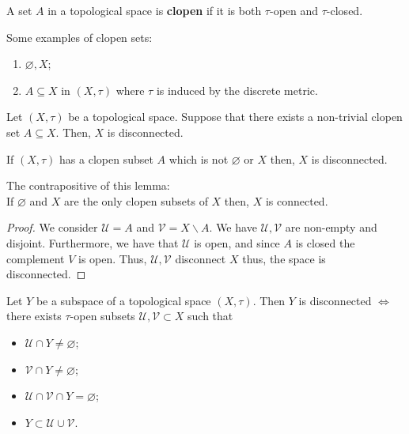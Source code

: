 \documentclass[12pt, a4paper]{article}
\begin{document}
\begin{definition}
    A set \(A\) in a topological space is \textbf{clopen} if it is both \(\tau\)-open and \(\tau\)-closed.
\end{definition}

\begin{example}
    Some examples of clopen sets:
    \begin{enumerate}
        \item \(\varnothing,X\);
        \item \(A \subseteq X\) in \((X,\tau)\) where \(\tau\) is induced by the discrete metric.
    \end{enumerate}
\end{example}


\begin{mdlemma}
    Let \((X,\tau)\) be a topological space. Suppose that there exists a non-trivial clopen set \(A \subseteq X\). Then, \(X\) is disconnected.
\end{mdlemma}

\begin{mdnote}
    If \((X,\tau)\) has a clopen subset \(A\) which is not \(\varnothing\) or \(X\) then, \(X\) is disconnected. 
\end{mdnote}

\begin{mdremark}
    The contrapositive of this lemma: \\
    If \(\varnothing\) and \(X\) are the only clopen subsets of \(X\) then, \(X\) is connected.
\end{mdremark}

\begin{proof}
    We consider \(\mathcal{U}=A\) and \(\mathcal{V}=X \backslash A\). We have \(\mathcal{U}, \mathcal{V}\) are non-empty and disjoint. Furthermore, we have that \(\mathcal{U}\) is open, and  since \(A\) is closed the complement \(V\) is open. Thus, \(\mathcal{U}, \mathcal{V}\) disconnect \(X\) thus, the space is disconnected.
\end{proof}

\begin{mdlemma}
    Let \(Y\) be a subspace of a topological space \((X,\tau)\). Then \(Y\) is disconnected \(\iff\) there exists \(\tau\)-open subsets \(\mathcal{U},\mathcal{V} \subset X\) such that 
    \begin{itemize}
        \item \(\mathcal{U} \cap Y \neq \varnothing\);
        \item \(\mathcal{V} \cap Y \neq \varnothing\);
        \item \(\mathcal{U} \cap \mathcal{V} \cap Y=\varnothing\);
        \item \(Y \subset \mathcal{U} \cup \mathcal{V}\).
    \end{itemize}
\end{mdlemma}
\end{document}
